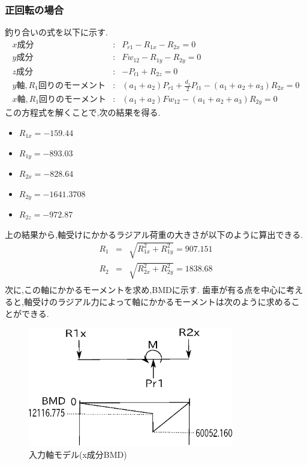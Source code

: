 \subsubsection{正回転の場合}
釣り合いの式を以下に示す.
\begin{eqnarray}
x成分&:&P_{r1}-R_{1x}-R_{2x}=0\\
y成分&:&Fw_{12}-R_{1y}-R_{2y}=0\\
z成分&:&-P_{t1}+R_{2z}=0\\
y軸,R_1回りのモーメント&:&(a_1+a_2)P_{r1}+\frac{d_1}{2}P_{t1}-(a_1+a_2+a_3)R_{2x}=0\\
x軸,R_1回りのモーメント&:&(a_1+a_2)Fw_{12}-(a_1+a_2+a_3)R_{2y}=0
\end{eqnarray}
この方程式を解くことで,次の結果を得る.


\begin{itemize}
\item $R_{1x}=-159.44$
\item $R_{1y}=-893.03$
\item $R_{2x}=-828.64$
\item $R_{2y}=-1641.3708$
\item $R_{2z}=-972.87$
\end{itemize}
上の結果から,軸受けにかかるラジアル荷重の大きさが以下のように算出できる.
\begin{eqnarray}
R_1 &=& \sqrt {R_{1x}^2+R_{1y}^2}=907.151\\
R_2 &=& \sqrt {R_{2x}^2+R_{2y}^2}=1838.68\\
\end{eqnarray}
次に,この軸にかかるモーメントを求め,BMDに示す.
歯車が有る点を中心に考えると,軸受けのラジアル力によって軸にかかるモーメントは次のように求めることができる.
\begin{figure}[htbp]
\begin{center}
\includegraphics[width=9cm]{../picture/jiku14.eps}
\end{center}
\caption{入力軸モデル(x成分BMD)}
\end{figure}
